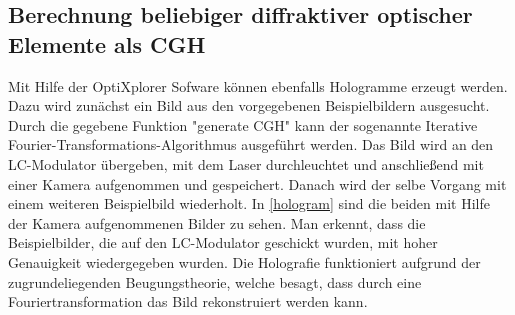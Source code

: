 \subsection{Berechnung beliebiger diffraktiver optischer Elemente als CGH}
Mit Hilfe der OptiXplorer Sofware können ebenfalls Hologramme erzeugt werden. Dazu wird zunächst ein Bild aus den vorgegebenen Beispielbildern ausgesucht. Durch die gegebene Funktion "generate CGH" kann der sogenannte Iterative Fourier-Transformations-Algorithmus ausgeführt werden. Das Bild wird an den LC-Modulator übergeben, mit dem Laser durchleuchtet und anschließend mit einer Kamera aufgenommen und gespeichert. Danach wird der selbe Vorgang mit einem weiteren Beispielbild wiederholt. In  \cref{hologram} sind die beiden mit Hilfe der Kamera aufgenommenen Bilder zu sehen. Man erkennt, dass die Beispielbilder, die auf den LC-Modulator geschickt wurden, mit hoher Genauigkeit wiedergegeben wurden. Die Holografie funktioniert aufgrund der zugrundeliegenden Beugungstheorie, welche besagt, dass durch eine Fouriertransformation das Bild rekonstruiert werden kann.

